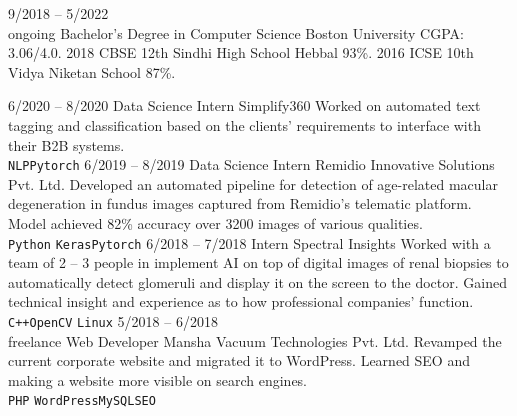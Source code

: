 \documentclass[9pt]{developercv} %
\begin{document}
\vspace{0.5cm}



\begin{entrylist}
	\entry
	{9/2018 -- 5/2022\\\footnotesize{ongoing}}
	{Bachelor's Degree in Computer Science}
	{Boston University}
	{CGPA: 3.06/4.0.}
	\entry
	{2018}
	{CBSE 12th}
	{Sindhi High School Hebbal}
	{93\%.}
	\entry
	{2016}
	{ICSE 10th}
	{Vidya Niketan School}
	{87\%.}
\end{entrylist}



\begin{entrylist}
	\entry
	{6/2020 -- 8/2020}
	{Data Science Intern}
	{Simplify360}
	{Worked on automated text tagging and classification based on the clients' requirements to interface with their B2B systems. \\
		\texttt{NLP}\slashsep\texttt{Pytorch}}
	\entry
	{6/2019 -- 8/2019}
	{Data Science Intern}
	{Remidio Innovative Solutions Pvt. Ltd.}
	{Developed an automated pipeline for detection of age-related macular degeneration in fundus images captured from Remidio’s telematic platform. Model achieved 82\% accuracy over 3200 images of various qualities.\\ \texttt{Python}
		\slashsep\texttt{Keras}\slashsep\texttt{Pytorch}}
	\entry
	{6/2018 -- 7/2018}
	{Intern}
	{Spectral Insights}
	{Worked with a team of 2 – 3 people in implement AI on top of digital images of renal biopsies to automatically detect glomeruli and display it on the screen to the doctor. Gained technical insight and experience as to how professional companies’ function. \\ \texttt{C++}\slashsep\texttt{OpenCV}
		\slashsep\texttt{Linux}}
	\entry
	{5/2018 -- 6/2018\\\footnotesize{freelance}}
	{Web Developer}
	{Mansha Vacuum Technologies Pvt. Ltd.}
	{Revamped the current corporate website and migrated it to WordPress. Learned SEO and making a website more visible on search engines. \\ \texttt{PHP}
		\slashsep\texttt{WordPress}\slashsep\texttt{MySQL}\slashsep\texttt{SEO}}
\end{entrylist}
\end{document}

